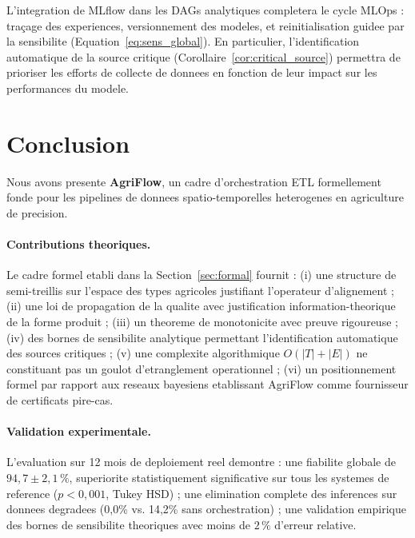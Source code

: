 \documentclass[12pt,a4paper]{article}
\theoremstyle{plain}
\theoremstyle{definition}
\theoremstyle{remark}
\begin{document}
L'integration de MLflow dans les DAGs analytiques completera le cycle
MLOps : traçage des experiences, versionnement des modeles, et
reinitialisation guidee par la sensibilite (Equation~\ref{eq:sens_global}).
En particulier, l'identification automatique de la source critique
(Corollaire~\ref{cor:critical_source}) permettra de prioriser les
efforts de collecte de donnees en fonction de leur impact sur les
performances du modele.

\section{Conclusion}
\label{sec:conclusion}

Nous avons presente \textbf{AgriFlow}, un cadre d'orchestration ETL
formellement fonde pour les pipelines de donnees spatio-temporelles
heterogenes en agriculture de precision.

\paragraph{Contributions theoriques.}
Le cadre formel etabli dans la Section~\ref{sec:formal} fournit :
(i) une structure de semi-treillis sur l'espace des types agricoles
justifiant l'operateur d'alignement ;
(ii) une loi de propagation de la qualite avec justification
information-theorique de la forme produit ;
(iii) un theoreme de monotonicite avec preuve rigoureuse ;
(iv) des bornes de sensibilite analytique permettant l'identification
automatique des sources critiques ;
(v) une complexite algorithmique $O(|T|+|E|)$ ne constituant pas un
goulot d'etranglement operationnel ;
(vi) un positionnement formel par rapport aux reseaux bayesiens
etablissant AgriFlow comme fournisseur de certificats pire-cas.

\paragraph{Validation experimentale.}
L'evaluation sur 12 mois de deploiement reel demontre :
une fiabilite globale de $94{,}7 \pm 2{,}1\,\%$, superiorite
statistiquement significative sur tous les systemes de reference
($p<0{,}001$, Tukey HSD) ;
une elimination complete des inferences sur donnees degradees
(0,0\% vs. 14,2\% sans orchestration) ;
une validation empirique des bornes de sensibilite theoriques
avec moins de $2\,\%$ d'erreur relative.
\end{document}
